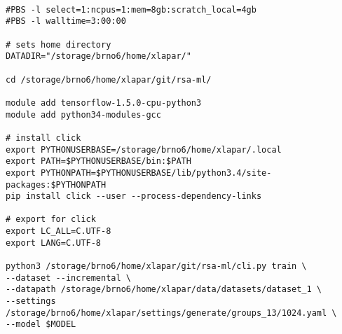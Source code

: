 \begin{verbatim}

#PBS -l select=1:ncpus=1:mem=8gb:scratch_local=4gb
#PBS -l walltime=3:00:00

# sets home directory
DATADIR="/storage/brno6/home/xlapar/"

cd /storage/brno6/home/xlapar/git/rsa-ml/

module add tensorflow-1.5.0-cpu-python3
module add python34-modules-gcc

# install click
export PYTHONUSERBASE=/storage/brno6/home/xlapar/.local
export PATH=$PYTHONUSERBASE/bin:$PATH
export PYTHONPATH=$PYTHONUSERBASE/lib/python3.4/site-packages:$PYTHONPATH
pip install click --user --process-dependency-links

# export for click
export LC_ALL=C.UTF-8
export LANG=C.UTF-8

python3 /storage/brno6/home/xlapar/git/rsa-ml/cli.py train \
--dataset --incremental \
--datapath /storage/brno6/home/xlapar/data/datasets/dataset_1 \
--settings /storage/brno6/home/xlapar/settings/generate/groups_13/1024.yaml \
--model $MODEL

\end{verbatim}

 